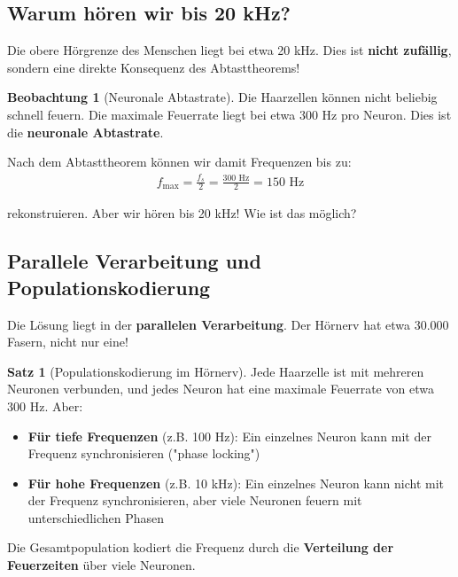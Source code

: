 ﻿\documentclass[a4paper,12pt]{report}
\theoremstyle{definition}
\newtheorem{satz}{Satz}
\newtheorem{beobachtung}{Beobachtung}
\begin{document}
	\subsection{Warum hören wir bis 20 kHz?}
	
	Die obere Hörgrenze des Menschen liegt bei etwa 20 kHz. Dies ist \textbf{nicht zufällig}, sondern eine direkte Konsequenz des Abtasttheorems!
	
	\begin{beobachtung}[Neuronale Abtastrate]
		Die Haarzellen können nicht beliebig schnell feuern. Die maximale Feuerrate liegt bei etwa 300 Hz pro Neuron. Dies ist die \textbf{neuronale Abtastrate}.
		
		Nach dem Abtasttheorem können wir damit Frequenzen bis zu:
		\begin{align}
			f_{\max} = \frac{f_s}{2} = \frac{300 \text{ Hz}}{2} = 150 \text{ Hz}
		\end{align}
		
		rekonstruieren. Aber wir hören bis 20 kHz! Wie ist das möglich?
	\end{beobachtung}
	
	\subsection{Parallele Verarbeitung und Populationskodierung}
	
	Die Lösung liegt in der \textbf{parallelen Verarbeitung}. Der Hörnerv hat etwa 30.000 Fasern, nicht nur eine!
	
	\begin{satz}[Populationskodierung im Hörnerv]
		Jede Haarzelle ist mit mehreren Neuronen verbunden, und jedes Neuron hat eine maximale Feuerrate von etwa 300 Hz. Aber:
		\begin{itemize}
			\item[-] \textbf{Für tiefe Frequenzen} (z.B. 100 Hz): Ein einzelnes Neuron kann mit der Frequenz synchronisieren ("phase locking")
			\item[-] \textbf{Für hohe Frequenzen} (z.B. 10 kHz): Ein einzelnes Neuron kann nicht mit der Frequenz synchronisieren, aber viele Neuronen feuern mit unterschiedlichen Phasen
		\end{itemize}
		
		Die Gesamtpopulation kodiert die Frequenz durch die \textbf{Verteilung der Feuerzeiten} über viele Neuronen.
	\end{satz}
	
\end{document}
